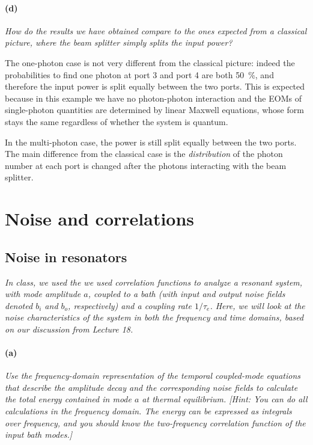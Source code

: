 \documentclass[hyperref, a4paper]{article}
\begin{document}
\paragraph*{(d)} \textit{How do the results we have obtained compare to the ones expected from a classical picture, where the beam splitter simply splits the input power?} 

The one-photon case is not very different from the classical picture:
indeed the probabilities to find one photon at port 3 and port 4 are both \SI{50}{\percent},
and therefore the input power is split equally between the two ports. 
This is expected because in this example we have no photon-photon interaction 
and the EOMs of single-photon quantities are determined by linear Maxwell equations,
whose form stays the same regardless of whether the system is quantum.

In the multi-photon case, the power is still split equally between the two ports.
The main difference from the classical case 
is the \emph{distribution} of the photon number at each port 
is changed after the photons interacting with the beam splitter.


\section{Noise and correlations}

\subsection{Noise in resonators}

\textit{In class, we used the we used correlation functions to analyze a resonant system, with mode amplitude $a$, coupled to a bath (with input and output noise fields denoted $b_i$ and $b_o$, respectively) and a coupling rate $1 / \tau_e$. Here, we will look at the noise characteristics of the system in both the frequency and time domains, based on our discussion from Lecture 18.}

\paragraph*{(a)} \textit{Use the frequency-domain representation of the temporal coupled-mode equations that describe the amplitude decay and the corresponding noise fields to calculate the total energy contained in mode $a$ at thermal equilibrium. [Hint: You can do all calculations in the frequency domain. The energy can be expressed as integrals over frequency, and you should know the two-frequency correlation function of the input bath modes.]} 
\end{document}
